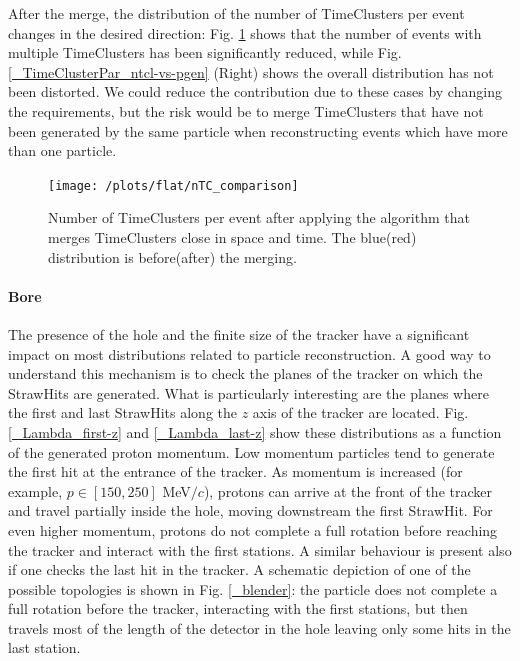 \documentclass[12pt,a4paper,openright, oneside, titlepage]{book} %
\begin{document}
\noindent After the merge, the distribution of the number of TimeClusters per event changes in the desired direction: 
Fig. \ref{_nTC_comparison} shows that the number of events with multiple TimeClusters has been significantly reduced, while Fig. \ref{_TimeClusterPar_ntcl-vs-pgen} (Right) shows the overall distribution has not been distorted.
We could reduce the contribution due to these cases by changing the requirements, but the risk would be to merge TimeClusters that have not been generated by the same particle when reconstructing events which have more than one particle.

\begin{figure}[!htb]
\centering
\texttt{[image: /plots/flat/nTC\_comparison]}
\caption[Number of TimeClusters pre-post merge]
{Number of TimeClusters per event after applying the algorithm 
that merges TimeClusters close in space and time. The blue(red) distribution
is before(after) the merging.}
\label{_nTC_comparison}
\end{figure}

\paragraph{Bore} 
The presence of the hole and the finite size of the tracker have a significant impact on most distributions related to particle reconstruction.
A good way to understand this mechanism is to check the planes of the tracker on which the StrawHits are generated.
What is particularly interesting are the planes where the first and last StrawHits along the $z$ axis of the tracker are located. 
Fig. \ref{_Lambda_first-z} and \ref{_Lambda_last-z} show these distributions as a function of the generated proton momentum.
Low momentum particles tend to generate the first hit at the entrance of the tracker. 
As momentum is increased (for example, $p \in [150,250]$ MeV$/c$), protons can arrive at the front of the tracker and travel partially inside the hole, moving downstream the first StrawHit.
For even higher momentum, protons do not complete a full rotation before reaching the tracker and interact with the first stations.
A similar behaviour is present also if one checks the last hit in the tracker. 
A schematic depiction of one of the possible topologies is shown in Fig. \ref{_blender}: the particle does not complete a full rotation before the tracker, interacting with the first stations, but then travels most of the length of the detector in the hole leaving only some hits in the last station.
\end{document}

